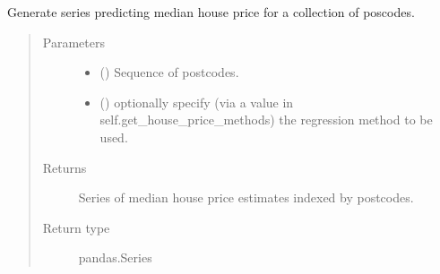 \documentclass[letterpaper,10pt,english]{sphinxmanual}
\begin{document}
\begin{fulllineitems}
\begin{fulllineitems}
\begin{sphinxVerbatim}[commandchars=\\\{\}]
\PYG{p}{[} \PYG{p}{]}
\end{sphinxVerbatim}

\end{fulllineitems}


\begin{fulllineitems}
\label{\detokenize{index:flood_tool.Tool.get_median_house_price_estimate}}
\sphinxAtStartPar
Generate series predicting median house price for a collection
of poscodes.
\begin{quote}\begin{description}
\item[{Parameters}] \leavevmode\begin{itemize}
\item {} 
\sphinxAtStartPar
{} () \textendash{} Sequence of postcodes.

\item {} 
\sphinxAtStartPar
{} (\sphinxstyleliteralemphasis{\sphinxupquote{ (}}\sphinxstyleliteralemphasis{\sphinxupquote{)}}) \textendash{} optionally specify (via a value in
self.get\_house\_price\_methods) the regression
method to be used.

\end{itemize}

\item[{Returns}] \leavevmode
\sphinxAtStartPar
Series of median house price estimates indexed by postcodes.

\item[{Return type}] \leavevmode
\sphinxAtStartPar
pandas.Series


\end{description}
\end{quote}
\end{fulllineitems}
\end{fulllineitems}
\end{document}
